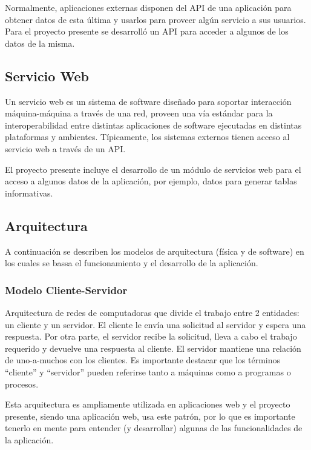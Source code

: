 Normalmente, aplicaciones externas disponen del API de una aplicación para obtener datos de esta última y usarlos para proveer algún servicio a sus usuarios. Para el proyecto presente se desarrolló un API para acceder a algunos de los datos de la misma.

\subsection{Servicio Web} \label{webService}
Un servicio web es un sistema de software diseñado para soportar interacción máquina-máquina a través de una red, proveen una vía estándar para la interoperabilidad entre distintas aplicaciones de software ejecutadas en distintas plataformas y ambientes. \cite{webServiceW3C} Típicamente, los sistemas externos tienen acceso al servicio web a través de un API.

El proyecto presente incluye el desarrollo de un módulo de servicios web para el acceso a algunos datos de la aplicación, por ejemplo, datos para generar tablas informativas.

\subsection{Arquitectura}
A continuación se describen los modelos de arquitectura (física y de software) en los cuales se bassa el funcionamiento y el desarrollo de la aplicación.

\subsubsection{Modelo Cliente-Servidor}
Arquitectura de redes de computadoras que divide el trabajo entre 2 entidades: un cliente y un servidor. El cliente le envía una solicitud al servidor y espera una respuesta. Por otra parte, el servidor recibe la solicitud, lleva a cabo el trabajo requerido y devuelve una respuesta al cliente. \cite{redesTanenbaum} El servidor mantiene una relación de uno-a-muchos con los clientes. Es importante destacar que los términos “cliente” y “servidor” pueden referirse tanto a máquinas como a programas o procesos.

Esta arquitectura es ampliamente utilizada en aplicaciones web y el proyecto presente, siendo una aplicación web, usa este patrón, por lo que es importante tenerlo en mente para entender (y desarrollar) algunas de las funcionalidades de la aplicación.

